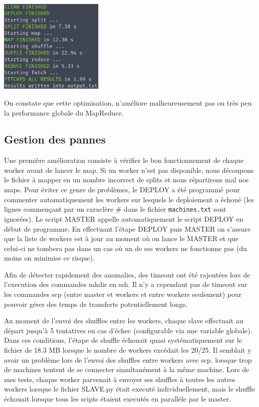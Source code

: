 \documentclass[11pt,a4paper]{article}
\begin{document}
\includegraphics[width=5cm]{screenshot9.png}

On constate que cette optimisation, n'améliore malheureusement pas ou très peu la performance globale du MapReduce.

\subsection*{Gestion des pannes}
Une première amélioration consiste à vérifier le bon fonctionnement de chaque worker avant de lancer le map. Si un worker n'est pas disponible, nous découpons le fichier à mapper en un nombre incorrect de splits et nous répartirons mal nos maps. Pour éviter ce genre de problèmes, le DEPLOY a été programmé pour commenter automatiquement les workers sur lesquels le deploiement a échoué (les lignes commençant par un caraclère \# dans le fichier \texttt{machines.txt} sont ignorées). Le script MASTER appelle automatiquement le script DEPLOY en début de programme. En effectuant l'étape DEPLOY puis MASTER on s'assure que la liste de workers est à jour au moment où on lance le MASTER et que celui-ci ne tombera pas dans un cas où un de ses workers ne fonctionne pas (du moins on minimise ce risque).

Afin de détecter rapidement des anomalies, des timeout ont été rajoutées lors de l'execution des commandes mkdir en ssh. Il n'y a cependant pas de timeout sur les commandes scp (entre master et workers et entre workers seulement) pour pouvoir gérer des temps de transferts potentiellement longs.

Au moment de l'envoi des shuffles entre les workers, chaque slave effectuait au départ jusqu'à 5 tentatives en cas d'échec (configurable via une variable globale). Dans ces conditions, l'étape de shuffle échouait quasi systématiquement sur le fichier de 18.3 MB lorsque le nombre de workers excédait les 20/25. Il semblait y avoir un problème lors de l'envoi des shuffles entre workers avec scp, lorsque trop de machines tentent de se connecter simultanément à la même machine. Lors de mes tests, chaque worker parvenait à envoyer ses shuffles à toutes les autres workers lorsque le fichier SLAVE.py était executé individuellement, mais le shuffle échouait lorsque tous les scipts étaient executés en parallèle par le master.
\end{document}
